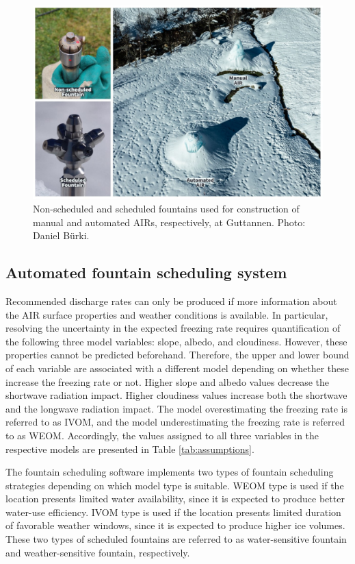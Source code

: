 \begin{figure}[htb]
	\includegraphics[width=\textwidth]{figs/AIR_fountains.jpg}
	\caption{Non-scheduled and scheduled fountains used for construction of manual and automated \ac{AIRs}, respectively, at
		Guttannen. Photo: Daniel Bürki.}
	\label{fig:autovsman}
\end{figure}

\subsection{Automated fountain scheduling system}

Recommended discharge rates can only be produced if more information about the \ac{AIR} surface properties and
weather conditions is available. In particular, resolving the uncertainty in the expected freezing rate requires
quantification of the following three model variables: slope, albedo, and cloudiness. However, these properties
cannot be predicted beforehand. Therefore, the upper and lower bound of each variable are associated with a
different model depending on whether these increase the freezing rate or not.  Higher slope and albedo values
decrease the shortwave radiation impact. Higher cloudiness values increase both the shortwave and the longwave
radiation impact. The model overestimating the freezing rate is referred to as \ac{IVOM}, and the model
underestimating the freezing rate is referred to as \ac{WEOM}. Accordingly, the values
assigned to all three variables in the respective models are presented in Table \ref{tab:assumptions}.

The fountain scheduling software implements two types of fountain scheduling strategies depending on which
model type is suitable. \ac{WEOM} type is used if the location presents limited water availability, since it is expected to
produce better water-use efficiency. \ac{IVOM} type is used if the location presents limited duration of favorable
weather windows, since it is expected to produce higher ice volumes. These two types of scheduled fountains are referred to as water-sensitive fountain and weather-sensitive fountain, respectively.

